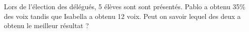 
Lors de l'élection des délégués, 5 élèves sont sont présentés. Pablo a obtenu 35\% des voix tandis que Isabella a obtenu 12 voix. Peut on savoir lequel des deux a obtenu le meilleur résultat ?